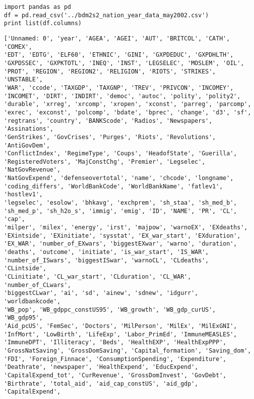 \documentclass[12pt,fleqn]{article}\usepackage{common}
\begin{document}

\begin{verbatim}
import pandas as pd
df = pd.read_csv('../bdm2s2_nation_year_data_may2002.csv')
print list(df.columns)
\end{verbatim}

\begin{verbatim}
['Unnamed: 0', 'year', 'AGEA', 'AGEI', 'AUT', 'BRITCOL', 'CATH', 'COMEX',
'EDT', 'EDTG', 'ELF60', 'ETHNIC', 'GINI', 'GXPDEDUC', 'GXPDHLTH',
'GXPDSSEC', 'GXPKTOTL', 'INEQ', 'INST', 'LEGSELEC', 'MOSLEM', 'OIL',
'PROT', 'REGION', 'REGION2', 'RELIGION', 'RIOTS', 'STRIKES', 'UNSTABLE',
'WAR', 'ccode', 'TAXGDP', 'TAXGNP', 'TREV', 'PRIVCON', 'INCOMEY',
'INCOMET', 'DIRT', 'INDIRT', 'democ', 'autoc', 'polity', 'polity2',
'durable', 'xrreg', 'xrcomp', 'xropen', 'xconst', 'parreg', 'parcomp',
'exrec', 'exconst', 'polcomp', 'bdate', 'bprec', 'change', 'd3', 'sf',
'regtrans', 'country', 'BANKScode', 'Radios', 'Newspapers', 'Assinations',
'GenStrikes', 'GovCrises', 'Purges', 'Riots', 'Revolutions', 'AntiGovDem',
'ConflictIndex', 'RegimeType', 'Coups', 'HeadofState', 'Guerilla',
'RegisteredVoters', 'MajConstChg', 'Premier', 'Legselec', 'NatGovRevenue',
'NatGovExpend', 'defenseovertotal', 'name', 'chcode', 'longname',
'coding_differs', 'WorldBankCode', 'WorldBankName', 'fatlev1', 'hostlev1',
'legselec', 'esolow', 'bhkavg', 'exchprem', 'sh_staa', 'sh_med_b',
'sh_med_p', 'sh_h2o_s', 'immig', 'emig', 'ID', 'NAME', 'PR', 'CL', 'cap',
'milper', 'milex', 'energy', 'irst', 'majpow', 'warnoEX', 'EXdeaths',
'EXintside', 'EXinitiate', 'sysstat', 'EX_war_start', 'EXduration',
'EX_WAR', 'number_of_EXwars', 'biggestEXwar', 'warno', 'duration',
'deaths', 'outcome', 'initiate', 'is_war_start', 'IS_WAR',
'number_of_ISwars', 'biggestISwar', 'warnoCL', 'CLdeaths', 'CLintside',
'CLinitiate', 'CL_war_start', 'CLduration', 'CL_WAR', 'number_of_CLwars',
'biggestCLwar', 'ai', 'sd', 'ainew', 'sdnew', 'idgurr', 'worldbankcode',
'WB_pop', 'WB_gdppc_constUS95', 'WB_growth', 'WB_gdp_curUS', 'WB_gdp95',
'Aid_pcUS', 'FemSec', 'Doctors', 'MilPerson', 'MilEx', 'MilExGNI',
'InfMort', 'LowBirth', 'LifeExp', 'Labor_PrimEd', 'ImmuneMEASLES',
'ImmuneDPT', 'Illiteracy', 'Beds', 'HealthEXP', 'HealthExpPPP',
'GrossNatSaving', 'GrossDomSaving', 'Capital_formation', 'Saving_dom',
'FDI', 'Foreign_Finnace', 'ConsumptionSpending', 'Expenditure',
'Deathrate', 'newspaper', 'HealthExpend', 'EducExpend',
'CapitalExpend_tot', 'CurRevenue', 'GrossDomInvest', 'GovDebt',
'Birthrate', 'total_aid', 'aid_cap_constUS', 'aid_gdp', 'CapitalExpend',

\end{verbatim}
\end{document}
